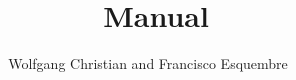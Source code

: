 \documentclass[10pt,final]{flwide10}
\begin{document}
  \frontmatter
  \title{\Ejs\ Manual}


  \author{\center Wolfgang Christian \linebreak and \linebreak Francisco Esquembre}

    \maketitle

  \frontmatter

  \mainmatter
 
 

    \appendix

  \backmatter
    
    

\end{document}
